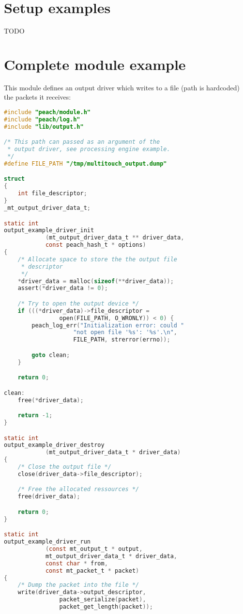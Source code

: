 %
%
\section{Setup examples}
TODO

%
%
\section{Complete module example}

This module defines an output driver which writes to a file (path is 
hardcoded) the packets it receives:
\begin{lstlisting}[language=C,
caption=Complete Output \& Module example]
#include "peach/module.h"
#include "peach/log.h"
#include "lib/output.h"

/* This path can passed as an argument of the 
 * output driver, see processing engine example.
 */
#define FILE_PATH "/tmp/multitouch_output.dump"

struct
{
    int file_descriptor;
}
_mt_output_driver_data_t;

static int 
output_example_driver_init
            (mt_output_driver_data_t ** driver_data, 
            const peach_hash_t * options)
{
    /* Allocate space to store the the output file 
     * descriptor 
     */
    *driver_data = malloc(sizeof(**driver_data));
    assert(*driver_data != 0);

    /* Try to open the output device */
    if (((*driver_data)->file_descriptor = 
                open(FILE_PATH, O_WRONLY)) < 0) {
        peach_log_err("Initialization error: could "
                    "not open file '%s': '%s'.\n", 
                    FILE_PATH, strerror(errno));

        goto clean;
    }

    return 0;

clean:
    free(*driver_data);

    return -1;
}

static int 
output_example_driver_destroy
            (mt_output_driver_data_t * driver_data)
{
    /* Close the output file */
    close(driver_data->file_descriptor);

    /* Free the allocated ressources */
    free(driver_data);

    return 0;
}

static int
output_example_driver_run
            (const mt_output_t * output,
            mt_output_driver_data_t * driver_data,
            const char * from,
            const mt_packet_t * packet)
{
    /* Dump the packet into the file */
    write(driver_data->output_descriptor,
                packet_serialize(packet),
                packet_get_length(packet));


\end{lstlisting}
